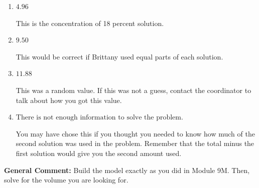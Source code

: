 \documentclass{extbook}[14pt]
\begin{document}
\begin{enumerate}
{\begin{enumerate}[label=\Alph*.]
*This is the correct option.
\item \( 4.96 \)

This is the concentration of 18 percent solution.
\item \( 9.50 \)

This would be correct if Brittany used equal parts of each solution.
\item \( 11.88 \)

This was a random value. If this was not a guess, contact the coordinator to talk about how you got this value.
\item \( \text{There is not enough information to solve the problem.} \)

You may have chose this if you thought you needed to know how much of the second solution was used in the problem. Remember that the total minus the first solution would give you the second amount used.
\end{enumerate}

\textbf{General Comment:} Build the model exactly as you did in Module 9M. Then, solve for the volume you are looking for.
}
\end{enumerate}
\end{document}
